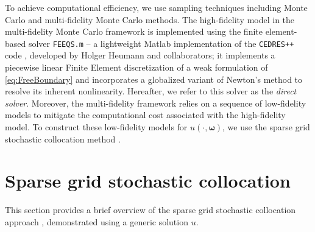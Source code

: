 \documentclass[final,3p,times,11pt]{elsarticle}
\begin{document}
To achieve computational efficiency, we use sampling techniques including Monte Carlo and multi-fidelity Monte Carlo methods. The high-fidelity model in the multi-fidelity Monte Carlo framework is implemented using the finite element-based solver {\tt FEEQS.m} \cite{Heumann:feeqsm} -- a lightweight Matlab implementation of the {\tt CEDRES++} code \cite{FaHe:2017,CEDRES}, developed by Holger Heumann and collaborators; it implements a piecewise linear Finite Element discretization of a weak formulation of \eqref{eq:FreeBoundary} and incorporates a globalized variant of Newton's method to resolve its inherent nonlinearity. Hereafter, we refer to this solver as the  {\it direct solver}. Moreover, the multi-fidelity framework relies on a sequence of low-fidelity models to mitigate the computational cost associated with the high-fidelity model. To construct these low-fidelity models for $u(\cdot, \boldsymbol{\omega})$, we use the sparse grid stochastic collocation method \cite{BaNoRi:2000, KlBa:2005, MaNi:2009, Sm:1963}.












\section{Sparse grid stochastic collocation}\label{sec:SC}
This section provides a brief overview of the sparse grid stochastic collocation approach \cite{BaNoRi:2000, KlBa:2005, MaNi:2009, Sm:1963}, demonstrated using a generic solution $u$. 
\end{document}
